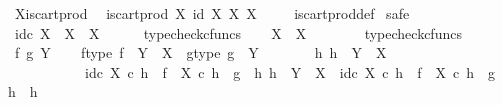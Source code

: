 \begin{isabellebody}
\isamarkupfalse%
\ X{\isacharunderscore}{\kern0pt}is{\isacharunderscore}{\kern0pt}cart{\isacharunderscore}{\kern0pt}prod{}{\isacharcolon}{\kern0pt}\isanewline
\ \ {\isachardoublequoteopen}is{\isacharunderscore}{\kern0pt}cart{\isacharunderscore}{\kern0pt}prod\ X\ {\isacharparenleft}{\kern0pt}id\ X{\isacharparenright}{\kern0pt}\ {\isacharparenleft}{\kern0pt}{\isasymbeta}\isactrlbsub X\isactrlesub {\isacharparenright}{\kern0pt}\ X\ {\isasymone}{\isachardoublequoteclose}\isanewline
%
\isadelimproof
\ \ %
\endisadelimproof
%
\isatagproof
{}\isamarkupfalse%
\ is{\isacharunderscore}{\kern0pt}cart{\isacharunderscore}{\kern0pt}prod{\isacharunderscore}{\kern0pt}def\isanewline
{}\isamarkupfalse%
\ safe\isanewline
\ \ \isamarkupfalse%
\ {\isachardoublequoteopen}id\isactrlsub c\ X\ {\isacharcolon}{\kern0pt}\ X\ {\isasymrightarrow}\ X{\isachardoublequoteclose}\isanewline
\ \ \ \ \isamarkupfalse%
\ typecheck{\isacharunderscore}{\kern0pt}cfuncs\isanewline
{}\isamarkupfalse%
\isanewline
\ \ \isamarkupfalse%
\ {\isachardoublequoteopen}{\isasymbeta}\isactrlbsub X\isactrlesub \ {\isacharcolon}{\kern0pt}\ X\ {\isasymrightarrow}\ {\isasymone}{\isachardoublequoteclose}\isanewline
\ \ \ \ \isamarkupfalse%
\ typecheck{\isacharunderscore}{\kern0pt}cfuncs\isanewline
{}\isamarkupfalse%
\isanewline
\ \ \isamarkupfalse%
\ f\ g\ Y\isanewline
\ \ \isamarkupfalse%
\ f{\isacharunderscore}{\kern0pt}type{\isacharcolon}{\kern0pt}\ {\isachardoublequoteopen}f\ {\isacharcolon}{\kern0pt}\ Y\ {\isasymrightarrow}\ X{\isachardoublequoteclose}\ \ g{\isacharunderscore}{\kern0pt}type{\isacharcolon}{\kern0pt}\ {\isachardoublequoteopen}g\ {\isacharcolon}{\kern0pt}\ Y\ {\isasymrightarrow}\ {\isasymone}{\isachardoublequoteclose}\isanewline
\ \ \isamarkupfalse%
\ \isamarkupfalse%
\ {\isachardoublequoteopen}{\isasymexists}h{\isachardot}{\kern0pt}\ h\ {\isacharcolon}{\kern0pt}\ Y\ {\isasymrightarrow}\ X\ {\isasymand}\isanewline
\ \ \ \ \ \ \ \ \ \ \ id\isactrlsub c\ X\ {\isasymcirc}\isactrlsub c\ h\ {\isacharequal}{\kern0pt}\ f\ {\isasymand}\ {\isasymbeta}\isactrlbsub X\isactrlesub \ {\isasymcirc}\isactrlsub c\ h\ {\isacharequal}{\kern0pt}\ g\ {\isasymand}\ {\isacharparenleft}{\kern0pt}{\isasymforall}h{}{\isachardot}{\kern0pt}\ h{}\ {\isacharcolon}{\kern0pt}\ Y\ {\isasymrightarrow}\ X\ {\isasymand}\ id\isactrlsub c\ X\ {\isasymcirc}\isactrlsub c\ h{}\ {\isacharequal}{\kern0pt}\ f\ {\isasymand}\ {\isasymbeta}\isactrlbsub X\isactrlesub \ {\isasymcirc}\isactrlsub c\ h{}\ {\isacharequal}{\kern0pt}\ g\ {\isasymlongrightarrow}\ h{}\ {\isacharequal}{\kern0pt}\ h{\isacharparenright}{\kern0pt}{\isachardoublequoteclose}\isanewline

\end{isabellebody}
